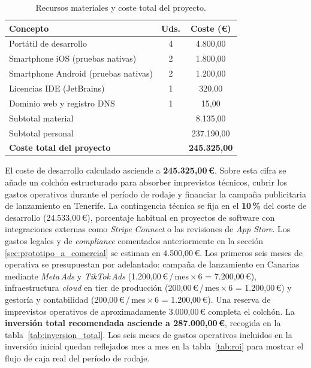 \begin{table}[H]
    \centering
    \renewcommand{\arraystretch}{1.2}
    \begin{tabular}{lcc}
        \toprule
        \textbf{Concepto}                 & \textbf{Uds.} & \textbf{Coste (€)}  \\
        \midrule
        Portátil de desarrollo            & 4             & 4.800,00            \\ Smartphone iOS (pruebas nativas)     & 2             & 1.800,00            \\ Smartphone Android (pruebas nativas) & 2             & 1.200,00            \\ Licencias IDE (JetBrains)            & 1             & 320,00              \\ Dominio web y registro DNS           & 1             & 15,00               \\
        \midrule
        Subtotal material                 &               & 8.135,00            \\ Subtotal personal                    &               & 237.190,00          \\
        \midrule
        \textbf{Coste total del proyecto} &               & \textbf{245.325,00} \\
        \bottomrule
    \end{tabular}
    \caption{Recursos materiales y coste total del proyecto.}
    \label{tab:recursos_material}
\end{table}

El coste de desarrollo calculado asciende a \textbf{245.325,00\,€}. Sobre esta cifra se añade un colchón estructurado para absorber imprevistos técnicos, cubrir los gastos operativos durante el período de rodaje y financiar la campaña publicitaria de lanzamiento en Tenerife. La contingencia técnica se fija en el \textbf{10\,\%} del coste de desarrollo (24.533,00\,€), porcentaje habitual en proyectos de software con integraciones externas como \textit{Stripe Connect} o las revisiones de \textit{App Store}. Los gastos legales y de  \textit{compliance} comentados anteriormente en la sección \ref*{sec:prototipo_a_comercial} se estiman en 4.500,00\,€. Los primeros seis meses de operativa se presupuestan por adelantado: campaña de lanzamiento en Canarias mediante \textit{Meta\,Ads} y \textit{TikTok\,Ads} (1.200,00\,€\,/\,mes\,$\times$\,6 = 7.200,00\,€), infraestructura \textit{cloud} en tier de producción (200,00\,€\,/\,mes\,$\times$\,6 = 1.200,00\,€) y gestoría y contabilidad (200,00\,€\,/\,mes\,$\times$\,6 = 1.200,00\,€). Una reserva de imprevistos operativos de aproximadamente 3.000,00\,€ completa el colchón. La \textbf{inversión total recomendada asciende a 287.000,00\,€}, recogida en la tabla~\ref{tab:inversion_total}. Los seis meses de gastos operativos incluidos en la inversión inicial quedan reflejados mes a mes en la tabla~\ref{tab:roi} para mostrar el flujo de caja real del período de rodaje.

